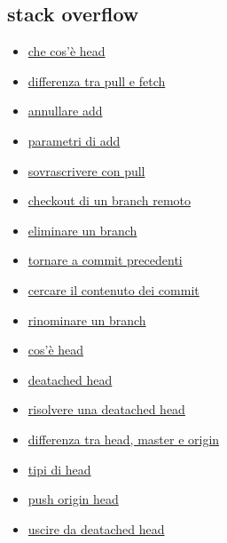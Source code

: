 \documentclass{article} \usepackage[textwidth=18cm,textheight=18cm]{geometry}
\begin{document}
\subsection{stack overflow}
\begin{itemize}
    \item \href{https://stackoverflow.com/questions/9529497/what-is-origin-in-git}
        {che cos'è head}
    \item \href{https://stackoverflow.com/questions/292357/what-is-the-difference-between-git-pull-and-git-fetch}
        {differenza tra pull e fetch}
    \item \href{https://stackoverflow.com/questions/348170/how-do-i-undo-git-add-before-commit?rq=1}
        {annullare add}
    \item \href{https://stackoverflow.com/questions/572549/difference-between-git-add-a-and-git-add?rq=1}
        {parametri di add}
    \item \href{https://stackoverflow.com/questions/1125968/how-do-i-force-git-pull-to-overwrite-local-files?rq=1}
        {sovrascrivere con pull}
    \item \href{https://stackoverflow.com/questions/1783405/how-do-i-check-out-a-remote-git-branch?rq=1}
        {checkout di un branch remoto}
    \item \href{https://stackoverflow.com/questions/2003505/how-do-i-delete-a-git-branch-locally-and-remotely?rq=1}
        {eliminare un branch}
    \item \href{https://stackoverflow.com/questions/4114095/how-do-i-revert-a-git-repository-to-a-previous-commit?rq=1}
        {tornare a commit precedenti}
    \item \href{https://stackoverflow.com/questions/7124914/how-to-search-a-git-repository-by-commit-message}
        {cercare il contenuto dei commit}
    \item \href{https://stackoverflow.com/questions/6591213/how-do-i-rename-a-local-git-branch?rq=1}
        {rinominare un branch }
    \item \href{https://stackoverflow.com/questions/2304087/what-is-head-in-git}
        {cos'è head}
    \item \href{https://www.git-tower.com/learn/git/faq/detached-head-when-checkout-commit}
        {deatached head}
    \item \href{https://stackoverflow.com/questions/34519665/how-can-i-move-head-back-to-a-previous-location-detached-head-undo-commits}
        {risolvere una deatached head}
    \item \href{https://stackoverflow.com/questions/8196544/what-are-the-git-concepts-of-head-master-origin}
        {differenza tra head, master e origin}
    \item \href{https://stackoverflow.com/questions/20954566/what-is-the-difference-from-head-head-and-head1}
        {tipi di head}
    \item \href{https://stackoverflow.com/questions/23241052/what-does-git-push-origin-head-mean}
        {push origin head}
    \item \href{https://stackoverflow.com/questions/10228760/fix-a-git-detached-head}
        {uscire da deatached head}
\end{itemize}
\end{document}
